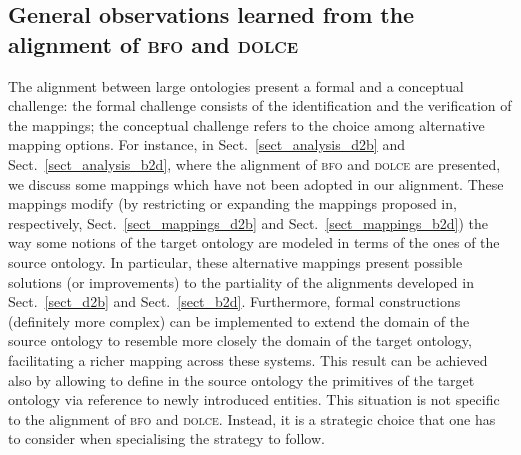 \documentclass[ao]{iosart2x}
\newcommand{\nb}[1]{\textcolor{red}{$|$}\marginpar{\hspace*{-0cm}\parbox{20mm}{\scriptsize\raggedright\textcolor{red}{#1}}}}
\newcommand{\pr}[1]{\mathtt{#1}}
\newcommand{\cn}[1]{\mathtt{#1}}
\newcommand{\dolce}{{\textsc{dolce}}}
\newcommand{\bfo}{{\textsc{bfo}}}
\newcommand {\EDdcat} {\textsc{ed}}
\newcommand {\PDdcat} {\textsc{pd}}
\newcommand {\TPd} {\ensuremath{\pr{tP}}}
\newcommand {\Pd} {\ensuremath{\pr{P}}}
\newcommand{\cntbcat}{\cn{cnt}}
\newcommand{\occbcat}{\cn{occ}}
\newcommand{\bfocpart}{\pr{cP}}
\newcommand{\bfoopart}{\pr{oP}}
\begin{document}
\subsection{General observations learned from the alignment of {\bfo} and {\dolce}}
The alignment between large ontologies present a formal and a conceptual challenge: the formal challenge consists of the identification and the verification of the mappings; the conceptual challenge refers to the choice among alternative mapping options.
For instance, in Sect.~\ref{sect_analysis_d2b} and Sect.~\ref{sect_analysis_b2d}, where the alignment of {\bfo} and {\dolce} are presented, we discuss some mappings which have not been adopted in our alignment. These mappings modify (by restricting or expanding the mappings proposed in, respectively, Sect.~\ref{sect_mappings_d2b} and Sect.~\ref{sect_mappings_b2d}) the way some notions of the target ontology are modeled in terms of the ones of the source ontology. 
In particular, these alternative mappings present possible solutions (or improvements) to the partiality of the alignments developed in Sect.~\ref{sect_d2b} and Sect.~\ref{sect_b2d}. Furthermore, formal constructions (definitely more complex) can be implemented to extend the domain of the source ontology to resemble more closely the domain of the target ontology, facilitating a richer mapping across these systems. This result can be achieved also by allowing to define in the source ontology the primitives of the target ontology via reference to newly introduced entities. This situation is not specific to the alignment of {\bfo} and {\dolce}. Instead, it is a strategic choice that one has to consider when specialising the strategy to follow.
 
\end{document}
